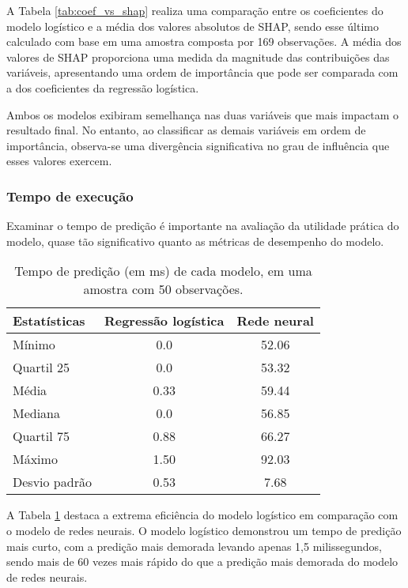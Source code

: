 A Tabela \ref{tab:coef_vs_shap} realiza uma comparação entre os coeficientes do modelo logístico
 e a média dos valores absolutos de SHAP, sendo esse último calculado com base em uma amostra composta por 169 observações. 
 A média dos valores de SHAP proporciona uma medida da magnitude das contribuições das variáveis,
  apresentando uma ordem de importância que pode ser comparada com a dos coeficientes da regressão logística.


 Ambos os modelos exibiram semelhança nas duas variáveis que mais impactam o resultado final.
  No entanto, ao classificar as demais variáveis em ordem de importância,
  observa-se uma divergência significativa no grau de influência que esses valores exercem.

\subsubsection{Tempo de execução}


Examinar o tempo de predição é importante na avaliação da utilidade prática do modelo, quase tão significativo
 quanto as métricas de desempenho do modelo.

\begin{table}[H]
\centering
\begin{tabular}{lcc}
  \hline
  \textbf{Estatísticas} & \textbf{Regressão logística} & \textbf{Rede neural} \\
  \hline
  Mínimo & 0.0 & 52.06 \\
  Quartil 25 & 0.0 & 53.32 \\
  Média & 0.33 & 59.44 \\
  Mediana & 0.0 & 56.85 \\
  Quartil 75 & 0.88 & 66.27 \\
  Máximo & 1.50 & 92.03 \\
  Desvio padrão & 0.53 & 7.68 \\
  \hline
\end{tabular}
\caption{Tempo de predição (em ms) de cada modelo, em uma amostra com 50 observações. }
\label{tab:bench_models}
\end{table}

A Tabela \ref{tab:bench_models} destaca a extrema eficiência do modelo logístico
 em comparação com o modelo de redes neurais. O modelo logístico demonstrou um tempo 
 de predição mais curto, com a predição mais demorada levando apenas 1,5 milissegundos,
  sendo mais de 60 vezes mais rápido do que a predição mais demorada do modelo de redes neurais.

